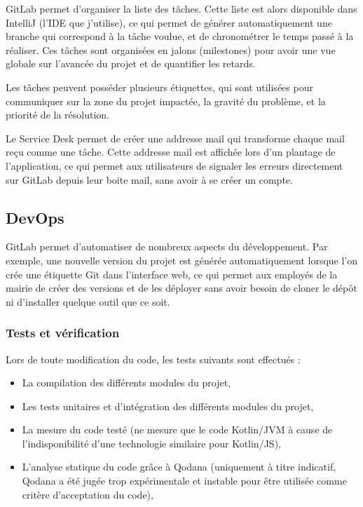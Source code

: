 \documentclass[11pt,french]{memoir}
\begin{document}
	GitLab permet d'organiser la liste des tâches.
	Cette liste est alors disponible dans IntelliJ (l'IDE que j'utilise), ce qui permet de générer automatiquement une branche qui correspond à la tâche voulue, et de chronométrer le temps passé à la réaliser.
	Ces tâches sont organisées en jalons (milestones) pour avoir une vue globale sur l'avancée du projet et de quantifier les retards.

	Les tâches peuvent posséder plusieurs étiquettes, qui sont utilisées pour communiquer sur la zone du projet impactée, la gravité du problème, et la priorité de la résolution.

	Le Service Desk permet de créer une addresse mail qui transforme chaque mail reçu comme une tâche.
	Cette addresse mail est affichée lors d'un plantage de l'application, ce qui permet aux utilisateurs de signaler les erreurs directement sur GitLab depuis leur boite mail, sans avoir à se créer un compte.

	\subsection{DevOps}\label{subsec:devops}

	GitLab permet d'automatiser de nombreux aspects du développement.
	Par exemple, une nouvelle version du projet est générée automatiquement lorsque l'on crée une étiquette Git dans l'interface web, ce qui permet aux employés de la mairie de créer des versions et de les déployer sans avoir besoin de cloner le dépôt ni d'installer quelque outil que ce soit.

	\subsubsection{Tests et vérification}

	Lors de toute modification du code, les tests suivants sont effectués :
	\begin{itemize}
		\item La compilation des différents modules du projet,
		\item Les tests unitaires et d'intégration des différents modules du projet,
		\item La mesure du code testé (ne mesure que le code Kotlin/JVM à cause de l'indisponibilité d'une technologie similaire pour Kotlin/JS),
		\item L'analyse statique du code grâce à Qodana (uniquement à titre indicatif, Qodana a été jugée trop expérimentale et instable pour être utilisée comme critère d'acceptation du code),
	\end{itemize}
\end{document}
